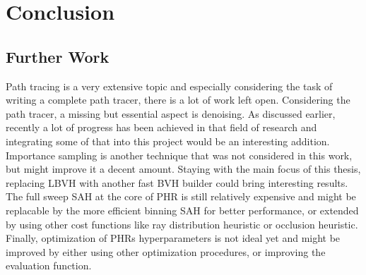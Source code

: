 \section{Conclusion}

\subsection{Further Work}
Path tracing is a very extensive topic and especially considering the task of writing a complete path tracer, there is a lot of work left open. Considering the path tracer, a missing but essential aspect is denoising. As discussed earlier, recently a lot of progress has been achieved in that field of research and integrating some of that into this project would be an interesting addition. Importance sampling is another technique that was not considered in this work, but might improve it a decent amount. 
Staying with the main focus of this thesis, replacing LBVH with another fast BVH builder could bring interesting results. The full sweep SAH at the core of PHR is still relatively expensive and might be replacable by the more efficient binning SAH for better performance, or extended by using other cost functions like ray distribution heuristic or occlusion heuristic. Finally, optimization of PHRs hyperparameters is not ideal yet and might be improved by either using other optimization procedures, or improving the evaluation function.
